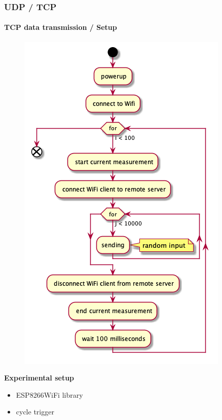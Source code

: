 \begin{frame}
	\frametitle{UDP / TCP}
	\framesubtitle{TCP data transmission / Setup}
	\begin{minipage}[c]{0.60 \textwidth}
		\begin{figure}[H]
			\centering
			\includegraphics[width = 0.6 \linewidth]{fig/UDP_TCP/tcp_uml.png}
		\end{figure}
	\end{minipage}
	\begin{minipage}[t]{0.30 \textwidth}
		\vspace{-100pt}
		\textbf{Experimental setup}
		\begin{itemize}
			\item ESP8266WiFi library
			\item cycle trigger
		\end{itemize}
	\end{minipage}
\end{frame}
